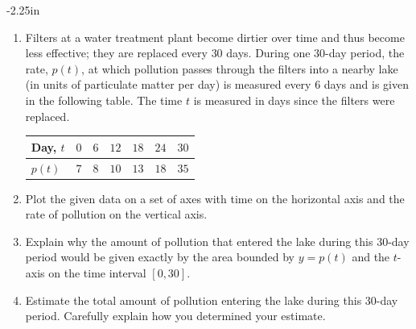 \begin{adjustwidth*}{}{-2.25in}
\begin{multicols*}{2}
\begin{enumerate}[1)]
  \item Filters at a water treatment plant become dirtier over time and thus become less effective; they are replaced every $30$ days.  During one $30$-day period, the rate, $p(t)$, at which pollution passes through the filters into a nearby lake (in units of particulate matter per day) is measured every $6$ days and is given in the following table.  The time $t$  is measured in days since the filters were replaced.
\begin{center}
\begin{tabular}{|l|c|c|c|c|c|c|}
\hline
Day, $t$ & $0$ & $6$ & $12$ &	$18$ & $24$ & $30$ \\
\hline
$p(t)$ & $7$ & $8$ & $10$ &	$13$ & $18$ & $35$ \\
\hline
\end{tabular}
\end{center}
\ba
	\item Plot the given data on a set of axes with time on the horizontal axis and the rate of pollution on the vertical axis.
	\item Explain why the amount of pollution that entered the lake during this $30$-day period would be given exactly by the area bounded by $y = p(t)$ and the $t$-axis on the time interval $[0,30]$.
	\item Estimate the total amount of pollution entering the lake during this $30$-day period.  Carefully explain how you determined your estimate.
\ea
\end{enumerate}

\end{multicols*}
\end{adjustwidth*}

\clearpage

